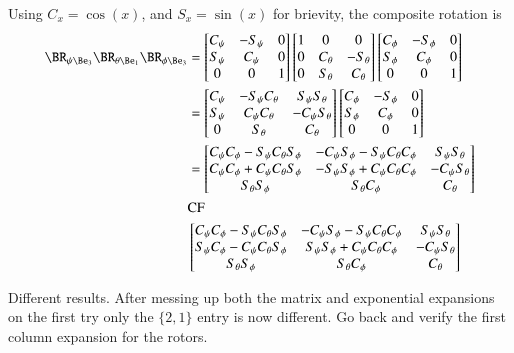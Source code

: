 \documentclass{article}
\begin{document}
Using $C_x = \cos(x)$, and $S_x = \sin(x)$ for brievity, the composite rotation is
\begin{align*}
\BR_{\psi \Be_3} \BR_{\theta \Be_1} \BR_{\phi \Be_3} 
&=
\begin{bmatrix}
C_\psi & - S_\psi & 0 \\
S_\psi & C_\psi & 0 \\
0 & 0 & 1 \\
\end{bmatrix} 
\begin{bmatrix}
1 & 0 & 0 \\
0 & C_\theta & - S_\theta \\
0 & S_\theta & C_\theta \\
\end{bmatrix} 
\begin{bmatrix}
C_\phi & - S_\phi & 0 \\
S_\phi & C_\phi & 0 \\
0 & 0 & 1 \\
\end{bmatrix} \\
&=
\begin{bmatrix}
C_\psi & - S_\psi C_\theta & S_\psi S_\theta \\
S_\psi & C_\psi C_\theta & -C_\psi S_\theta \\
0 & S_\theta & C_\theta \\
\end{bmatrix} 
\begin{bmatrix}
C_\phi & - S_\phi & 0 \\
S_\phi & C_\phi & 0 \\
0 & 0 & 1 \\
\end{bmatrix} \\
&=
\begin{bmatrix}
C_\psi C_\phi - S_\psi C_\theta S_\phi & -C_\psi S_\phi - S_\psi C_\theta C_\phi &   S_\psi S_\theta \\
C_\psi C_\phi + C_\psi C_\theta S_\phi & -S_\psi S_\phi + C_\psi C_\theta C_\phi & - C_\psi S_\theta \\
                       S_\theta S_\phi &                         S_\theta C_\phi &          C_\theta \\
\end{bmatrix} \\
&\text{CF} \\
&\begin{bmatrix}
C_\psi C_\phi - S_\psi C_\theta S_\phi & - C_\psi S_\phi - S_\psi C_\theta C_\phi & S_\psi S_\theta \\
S_\psi C_\phi - C_\psi C_\theta S_\phi &  S_\psi S_\phi + C_\psi C_\theta C_\phi & -C_\psi S_\theta \\
S_\theta S_\phi & S_\theta C_\phi & C_\theta \\
\end{bmatrix}
\end{align*}

Different results.  After messing up both the matrix and exponential expansions on the first try only the $\{2,1\}$ entry 
is now different.  Go back and verify the first column expansion for the rotors.



\end{document}
